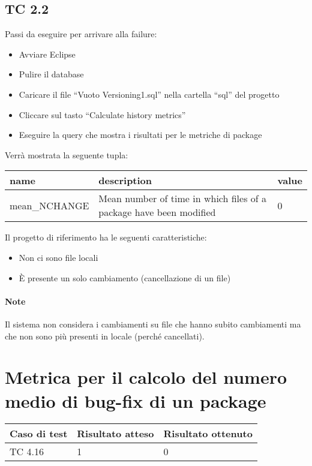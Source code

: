 \subsection*{TC 2.2}
Passi da eseguire per arrivare alla failure:
\begin{itemize}
 \item Avviare Eclipse
 \item Pulire il database
 \item Caricare il file ``Vuoto Versioning1.sql'' nella cartella ``sql'' del progetto
 \item Cliccare sul tasto ``Calculate history metrics''
 \item Eseguire la query che mostra i risultati per le metriche di package
\end{itemize}
Verrà mostrata la seguente tupla:
\begin{table}[ht]
 \centering
 \footnotesize
 \begin{tabular}{|l|p{8cm}|l|}
  \hline
  \textbf{name}		& \textbf{description}		& \textbf{value}		\\
  \hline
  mean\_NCHANGE		& Mean number of time in which files of a package have been modified	& 	0 \\
  \hline
 \end{tabular} 
\end{table}
\vspace{0.5cm}
\newline
Il progetto di riferimento ha le seguenti caratteristiche:
\begin{itemize}
 \item Non ci sono file locali
 \item È presente un solo cambiamento (cancellazione di un file)
\end{itemize}



\paragraph{Note} Il sistema non considera i cambiamenti su file che hanno subito cambiamenti ma che non sono più presenti in locale (perché cancellati).


\newpage

\section{Metrica per il calcolo del numero medio di bug-fix di un package}
\begin{table}[ht]
	\centering
	\begin{tabular}{| l | l | l |}
		\hline
		\rowcolor{lightgray}\textbf{Caso di test}	&	\textbf{Risultato atteso}	&	\textbf{Risultato ottenuto}	\\
		\hline
		TC 4.16						&	1				&	0			   	\\
		\hline
	\end{tabular}
\end{table}

